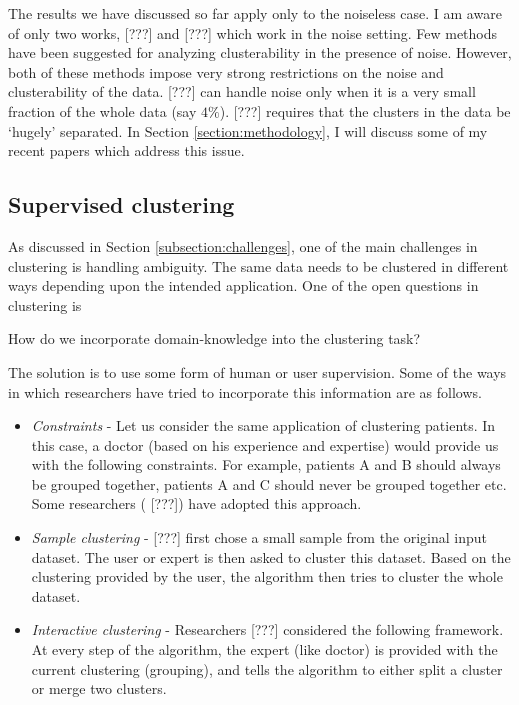 \documentclass[11pt]{article}
\begin{document}
The results we have discussed so far apply only to the noiseless case. I am aware of only two works, {\color{red} [???]\cite{balcan2012clustering}} and {\color{red} [???]\cite{ben2014clustering}} which work in the noise setting. Few methods have been suggested for analyzing clusterability in the presence of noise. However, both of these methods impose very strong restrictions on the noise and clusterability of the data. {\color{red} [???]\cite{balcan2012clustering}} can handle noise only when it is a very small fraction of the whole data (say $4\%$). {\color{red} [???]\cite{ben2014clustering}} requires that the clusters in the data be `hugely' separated. In Section \ref{section:methodology}, I will discuss some of my recent papers which address this issue.

\subsection{Supervised clustering}
As discussed in Section \ref{subsection:challenges}, one of the main challenges in clustering is handling ambiguity. The same data needs to be clustered in different ways depending upon the intended application. One of the open questions in clustering is 
\begin{center}
How do we incorporate domain-knowledge into the clustering task?
\end{center}

The solution is to use some form of human or user supervision. Some of the ways in which researchers have tried to incorporate this information are as follows.
\begin{itemize}[nolistsep]
\item {\em Constraints} -  Let us consider the same application of clustering patients. In this case, a doctor (based on his experience and expertise) would provide us with the following constraints. For example, patients A and B should always be grouped together, patients A and C should never be grouped together etc. Some researchers  ({\color{red} [???]\cite{basu2002semi,basu2004probabilistic, kulis2009semi}}) have adopted this approach.
\item {\em Sample clustering} - {\color{red} [???]\cite{ashtiani2015representation}} first chose a small sample from the original input dataset. The user or expert is then asked to cluster this dataset. Based on the clustering provided by the user, the algorithm then tries to cluster the whole dataset. 
\item {\em Interactive clustering} - Researchers {\color{red} [???]\cite{balcan2008clustering}} considered the following framework. At every step of the algorithm, the expert (like doctor) is provided with the current clustering (grouping), and tells the algorithm to either split a cluster or merge two clusters.
\end{itemize}
\end{document}
